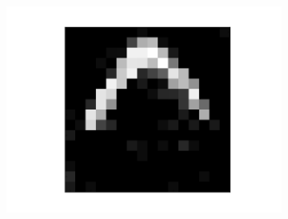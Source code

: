 \begin{figure}[h!]
\begin{subfigure}{.25\textwidth}
  		\label{fig:sub1}
	\end{subfigure}%
	\begin{subfigure}{.25\textwidth}
  		\centering
  		\includegraphics[width=.8\linewidth]{imgs/poker/compl41.png}
  		\label{fig:sub1}
	\end{subfigure}%
	

\end{figure}
